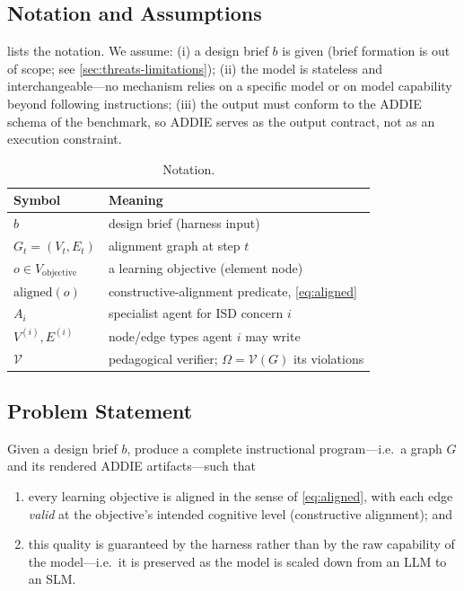 \subsection{Notation and Assumptions}
\label{sec:assumptions}

 lists the notation. We assume: (i) a design brief $b$ is given
(brief formation is out of scope; see \cref{sec:threats-limitations}); (ii) the
model is stateless and interchangeable---no mechanism relies on a specific model
or on model capability beyond following instructions; (iii) the output must
conform to the ADDIE schema of the benchmark, so ADDIE serves as the output
contract, not as an execution constraint.

\begin{table}[t]
  \caption{Notation.}
  \label{tab:notation}
  \small
  \begin{tabular}{@{}ll@{}}
    \toprule
    Symbol & Meaning \\
    \midrule
    $b$ & design brief (harness input) \\
    $G_t=(V_t,E_t)$ & alignment graph at step $t$ \\
    $o \in V_{\mathrm{objective}}$ & a learning objective (element node) \\
    $\mathrm{aligned}(o)$ & constructive-alignment predicate, \cref{eq:aligned} \\
    $A_i$ & specialist agent for ISD concern $i$ \\
    $V^{(i)},E^{(i)}$ & node/edge types agent $i$ may write \\
    $\mathcal{V}$ & pedagogical verifier; $\Omega=\mathcal{V}(G)$ its violations \\
    \bottomrule
  \end{tabular}
\end{table}

\subsection{Problem Statement}
\label{sec:problem-statement}

Given a design brief $b$, produce a complete instructional program---i.e.\ a graph
$G$ and its rendered ADDIE artifacts---such that
\begin{enumerate}
  \item[(i)] every learning objective is aligned in the sense of \cref{eq:aligned},
  with each edge \emph{valid} at the objective's intended cognitive level
  (constructive alignment); and
  \item[(ii)] this quality is guaranteed by the harness rather than by the raw
  capability of the model---i.e.\ it is preserved as the model is scaled down from
  an LLM to an SLM.
\end{enumerate}

